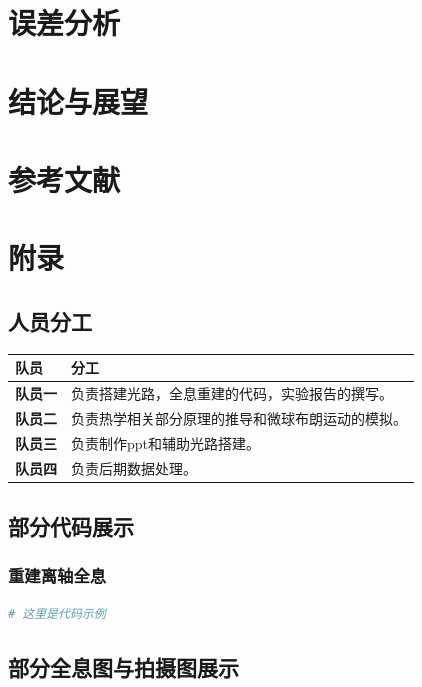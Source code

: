 \documentclass[a4paper,draft]{report} %
\begin{document}
\chapter{误差分析}

\chapter{结论与展望}

\chapter{参考文献}

\chapter{附录}
\section{人员分工}
\renewcommand{\arraystretch}{1.3} %
\begin{tabularx}{\textwidth}{>{\bfseries}l X}
\toprule
队员 & 分工 \\
\midrule
队员一 & 负责搭建光路，全息重建的代码，实验报告的撰写。 \\
队员二 & 负责热学相关部分原理的推导和微球布朗运动的模拟。 \\
队员三 & 负责制作ppt和辅助光路搭建。 \\
队员四 & 负责后期数据处理。 \\
\bottomrule
\end{tabularx}

\section{部分代码展示}

\subsection{重建离轴全息}
\begin{lstlisting}[language=Python, caption=离轴全息重建, label=code:generator]
# 这里是代码示例
\end{lstlisting}

\section{部分全息图与拍摄图展示}
\end{document}
